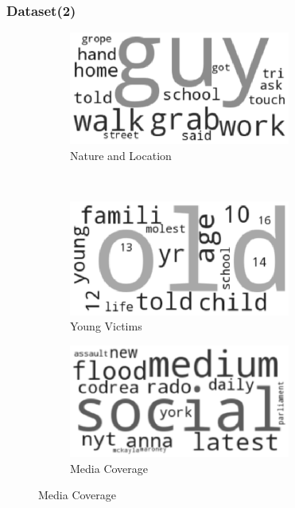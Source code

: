\documentclass{beamer}
\begin{document}
\begin{frame}
\frametitle{Dataset(2)}
\begin{figure}[h]
\centering
\begin{subfigure}{0.45\textwidth}
\includegraphics[width=0.8\textwidth]{SS64.eps}
\centering
\caption{Nature and Location}
\end{subfigure}\pause
~
\begin{subfigure}{0.45\textwidth}
\includegraphics[width=0.8\textwidth]{SS65.eps}
\centering
\caption{Young Victims}
\end{subfigure}\pause

\begin{subfigure}{0.45\textwidth}
\includegraphics[width=0.8\textwidth]{SS66.eps}
\centering
\caption{Media Coverage}
\end{subfigure}
\end{figure}
\end{frame}
\end{document}
